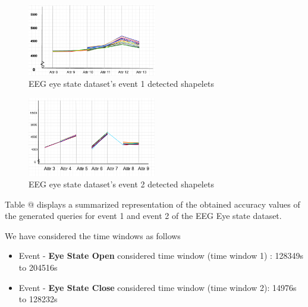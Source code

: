 \documentclass[conference]{IEEEtran}  %
\makeatletter
\newcommand*{\rom}[1]{\expandafter\@slowromancap\romannumeral #1@}
\makeatother
\begin{document}
\begin{figure}[h!]
\includegraphics[width=0.5\textwidth]{EEG_event1.png}
\caption{EEG eye state dataset's event 1 detected shapelets}
\end{figure}

\begin{figure}[h!]
\includegraphics[width=0.5\textwidth]{EEG_event2.png}
\caption{EEG eye state dataset's event 2 detected shapelets}
\end{figure}

Table \rom{2} displays a summarized representation of the obtained accuracy values of the generated queries for event 1 and event 2 of the EEG Eye state dataset.

We have considered the time windows as follows
\begin{itemize}
\item Event - \textbf{Eye State Open} considered time window (time window 1) : 128349s to 204516s
\item Event - \textbf{Eye State Close} considered time window (time window 2):
14976s to 128232s
\end{itemize}
\end{document}
